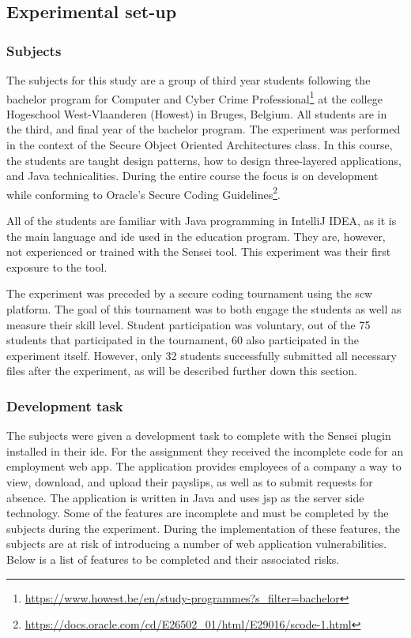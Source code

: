 \subsection{Experimental set-up}
\subsubsection{Subjects}
The subjects for this study are a group of third year students following the bachelor program for Computer and Cyber Crime Professional\footnote{\url{https://www.howest.be/en/study-programmes?s_filter=bachelor}} at the college Hogeschool West-Vlaanderen (Howest) in Bruges, Belgium.
All students are in the third, and final year of the bachelor program.
The experiment was performed in the context of the Secure Object Oriented Architectures class.
In this course, the students are taught design patterns, how to design three-layered applications, and Java technicalities.
During the entire course the focus is on development while conforming to Oracle's Secure Coding Guidelines\footnote{\url{https://docs.oracle.com/cd/E26502\_01/html/E29016/scode-1.html}}.

All of the students are familiar with Java programming in IntelliJ IDEA, as it is the main language and \gls{ide} used in the education program.
They are, however, not experienced or trained with the Sensei tool.
This experiment was their first exposure to the tool. 

The experiment was preceded by a secure coding tournament using the \gls{scw} platform.
The goal of this tournament was to both engage the students as well as measure their skill level.
Student participation was voluntary, out of the 75 students that participated in the tournament, 60 also participated in the experiment itself.
However, only 32 students successfully submitted all necessary files after the experiment, as will be described further down this section.

\subsubsection{Development task}
\label{sec:task}
The subjects were given a development task to complete with the Sensei plugin installed in their \gls{ide}.
For the assignment they received the incomplete code for an employment web app.
The application provides employees of a company a way to view, download, and upload their payslips, as well as to submit requests for absence.
The application is written in Java and uses \gls{jsp} as the server side technology.
Some of the features are incomplete and must be completed by the subjects during the experiment.
During the implementation of these features, the subjects are at risk of introducing a number of web application vulnerabilities.
Below is a list of features to be completed and their associated risks.

